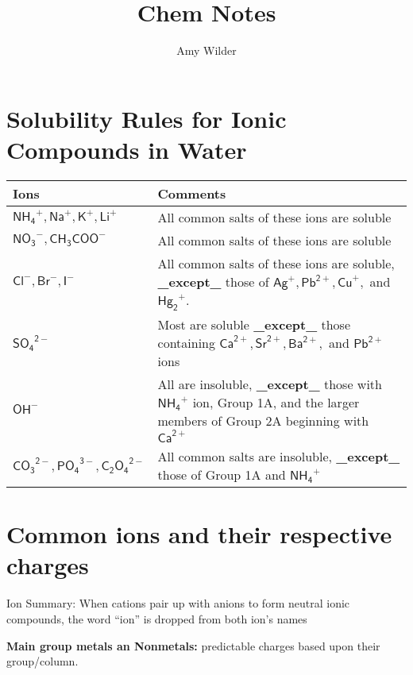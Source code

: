 \documentclass{article}
\title{Chem Notes}
\author{Amy Wilder}
\theoremstyle{mytheoremstyle}
\theoremstyle{mytheoremstyle}
\theoremstyle{myproblemstyle}
\begin{document}
\maketitle

\section{Solubility Rules for Ionic Compounds in Water}

\begin{tabular}{lp{4in}}
    \textbf{Ions} & \textbf{Comments} \\
    \hline
    \(\mathsf{{NH_4}^+, {Na}^+, {K}^+, {Li}^+}\)         & All common salts of these ions are soluble \\
    \(\mathsf{{NO_3}^-, {CH_3COO}^-}\)                   & All common salts of these ions are soluble \\
    \(\mathsf{{Cl}^-, {Br}^-, {I}^-}\)                   & All common salts of these ions are soluble, \textbf{\_except\_} those of \(\mathsf{{Ag}^+, {Pb}^{2+}, {Cu}^+,}\) and \(\mathsf{{{Hg}_2}^+}\). \\
    \(\mathsf{{SO_4}^{2-}}\)                             & Most are soluble \textbf{\_except\_} those containing \(\mathsf{{Ca}^{2+}, {Sr}^{2+}, {Ba}^{2+},}\) and \(\mathsf{{Pb}^{2+}}\) ions \\
    \(\mathsf{{OH}^-}\)                                  & All are insoluble, \textbf{\_except\_} those with \(\mathsf{{NH_4}^+}\) ion, Group 1A, and the larger members of Group 2A beginning with \(\mathsf{{Ca}^{2+}}\) \\
    \(\mathsf{{CO_3}^{2-}, {PO_4}^{3-}, {C_2O_4}^{2-}}\) & All common salts are insoluble, \textbf{\_except\_} those of Group 1A and \(\mathsf{{NH_4}^+}\) \\
\end{tabular}

\section{Common ions and their respective charges}

Ion Summary: When cations pair up with anions to form neutral ionic compounds, the word ``ion'' is dropped from both ion's names

\textbf{Main group metals an Nonmetals:} predictable charges based upon their group/column.
\end{document}
